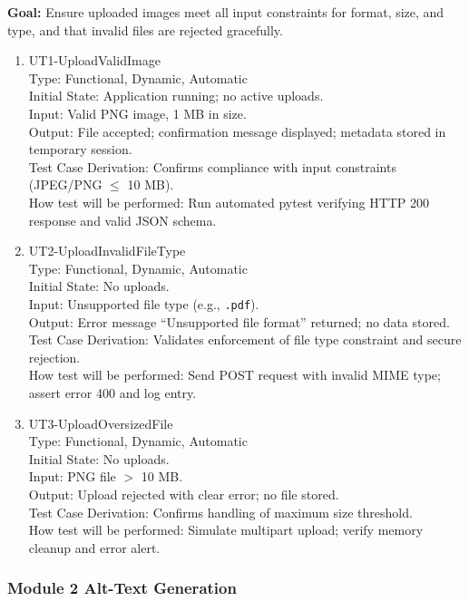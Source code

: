 \documentclass[12pt, titlepage]{article}
\begin{document}
\textbf{Goal:} Ensure uploaded images meet all input constraints for format, size, and type, and that invalid files are rejected gracefully.

\begin{enumerate}
\item{UT1-UploadValidImage\\}
Type: Functional, Dynamic, Automatic\\
Initial State: Application running; no active uploads.\\
Input: Valid PNG image, 1 MB in size.\\
Output: File accepted; confirmation message displayed; metadata stored in temporary session.\\
Test Case Derivation: Confirms compliance with input constraints (JPEG/PNG $\leq$ 10 MB).\\
How test will be performed: Run automated pytest verifying HTTP 200 response and valid JSON schema.

\item{UT2-UploadInvalidFileType\\}
Type: Functional, Dynamic, Automatic\\
Initial State: No uploads.\\
Input: Unsupported file type (e.g., \texttt{.pdf}).\\
Output: Error message ``Unsupported file format'' returned; no data stored.\\
Test Case Derivation: Validates enforcement of file type constraint and secure rejection.\\
How test will be performed: Send POST request with invalid MIME type; assert error 400 and log entry.

\item{UT3-UploadOversizedFile\\}
Type: Functional, Dynamic, Automatic\\
Initial State: No uploads.\\
Input: PNG file $>$ 10 MB.\\
Output: Upload rejected with clear error; no file stored.\\
Test Case Derivation: Confirms handling of maximum size threshold.\\
How test will be performed: Simulate multipart upload; verify memory cleanup and error alert.
\end{enumerate}

\subsubsection{Module 2 \textemdash{} Alt-Text Generation}
\end{document}
